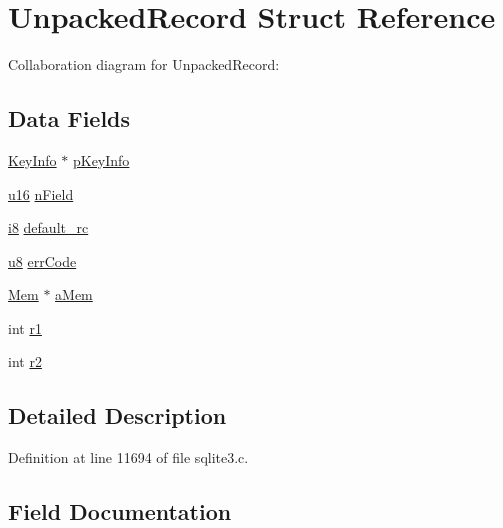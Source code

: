 \hypertarget{struct_unpacked_record}{}\section{Unpacked\+Record Struct Reference}
\label{struct_unpacked_record}


Collaboration diagram for Unpacked\+Record\+:
\subsection*{Data Fields}
\begin{DoxyCompactItemize}
\item 
\hyperlink{struct_key_info}{Key\+Info} $\ast$ \hyperlink{struct_unpacked_record_a2394c1e8402fe40753205256757b4165}{p\+Key\+Info}
\item 
\hyperlink{sqlite3_8c_a20f2299e322dcbde37cb07b16910b843}{u16} \hyperlink{struct_unpacked_record_a51c97c897154719f621dbc598c86cda5}{n\+Field}
\item 
\hyperlink{sqlite3_8c_ad11a1324ecade336dc6ce17a20cf6617}{i8} \hyperlink{struct_unpacked_record_ad90ccdf8e51753853ad6479dcd75677e}{default\+\_\+rc}
\item 
\hyperlink{sqlite3_8c_a74a0f6424ae628af25f23f0a35f6ead3}{u8} \hyperlink{struct_unpacked_record_a29338b8c3b03fac4668584ae6150e70b}{err\+Code}
\item 
\hyperlink{struct_mem}{Mem} $\ast$ \hyperlink{struct_unpacked_record_adfd56f8b1cc1790601ff0940d884c200}{a\+Mem}
\item 
int \hyperlink{struct_unpacked_record_af5e580602d23ab791f95c0d70a5e8be7}{r1}
\item 
int \hyperlink{struct_unpacked_record_a509ffeb9d1f16c38da3dd6b47ee0c47e}{r2}
\end{DoxyCompactItemize}


\subsection{Detailed Description}


Definition at line 11694 of file sqlite3.\+c.



\subsection{Field Documentation}
\hypertarget{struct_unpacked_record_adfd56f8b1cc1790601ff0940d884c200}{}
